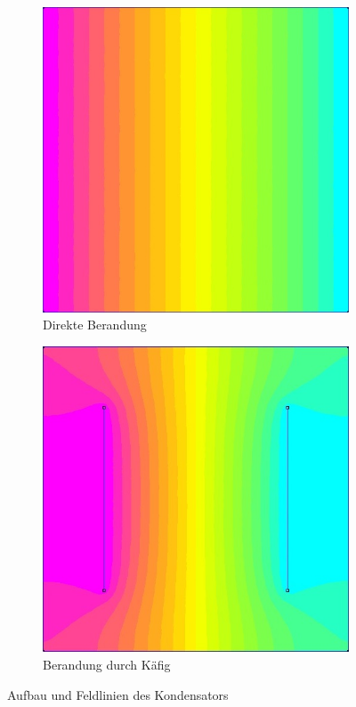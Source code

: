 \begin{figure}[h]
\begin{subfigure}[c]{0.38\textwidth}
		\includegraphics[width=\textwidth]{data/KeineRandbedingungen}
		\caption{Direkte Berandung}
		\label{fig:kleinRand}
	\end{subfigure}
	\begin{subfigure}[c]{0.38\textwidth}
		\includegraphics[width=\textwidth]{data/RandGross}
		\caption{Berandung durch Käfig}
		\label{fig:KäfigRand}
	\end{subfigure}
	\caption{Aufbau und Feldlinien des Kondensators}
\end{figure}

